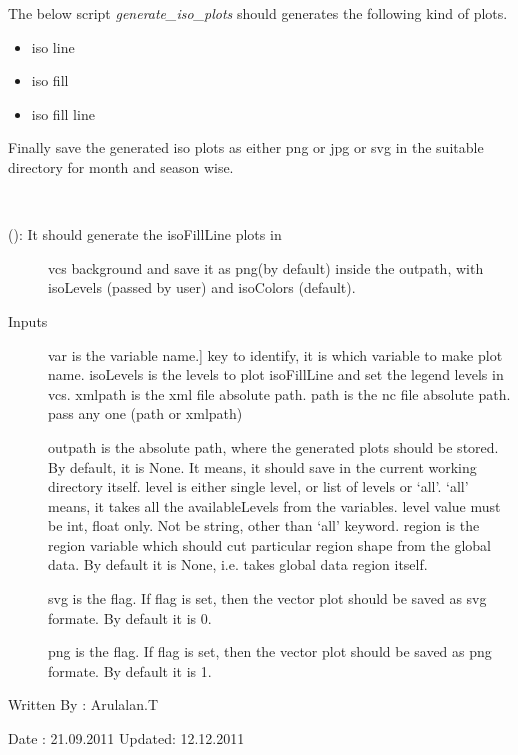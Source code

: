 \documentclass[letterpaper,10pt,english]{sphinxmanual}
\begin{document}
The below script \emph{generate\_iso\_plots} should generates the following kind of plots.
\begin{itemize}
\item {} 
iso line

\item {} 
iso fill

\item {} 
iso fill line

\end{itemize}

Finally save the generated iso plots as either png or jpg or svg in the suitable directory for month and season wise.
\label{diagnosis:module-generate_iso_plots}

\begin{fulllineitems}
\label{diagnosis:generate_iso_plots.genIsoFillLinePlots}~\begin{description}
\item[{{\hyperref[diagnosis:generate_iso_plots.genIsoFillLinePlots]{}} (): It should generate the isoFillLine plots in}] \leavevmode
vcs background and save it as png(by default) inside the outpath,
with isoLevels (passed by user) and isoColors (default).

\item[{Inputs}] \leavevmode{[}var is the variable name.{]}
key to identify, it is which variable to make plot name.
isoLevels is the levels to plot isoFillLine and set the legend
levels in vcs.
xmlpath is the xml file absolute path.
path is the nc file absolute path.
pass any one (path or xmlpath)

outpath is the absolute path, where the generated plots should be
stored. By default, it is None. It means, it should save in the
current working directory itself.
level is either single level, or list of levels or `all'.
`all' means, it takes all the availableLevels from the variables.
level value must be int, float only. Not be string, other than
`all' keyword.
region is the region variable which should cut particular region
shape from the global data. By default it is None, i.e. takes
global data region itself.

svg is the flag. If flag is set, then the vector plot should be
saved as svg formate. By default it is 0.

png is the flag. If flag is set, then the vector plot should be
saved as png formate. By default it is 1.

\end{description}

Written By : Arulalan.T

Date : 21.09.2011
Updated: 12.12.2011

\end{fulllineitems}
\end{document}
